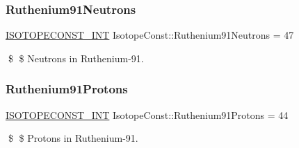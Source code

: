 \subsubsection{\texorpdfstring{Ruthenium91\+Neutrons}{Ruthenium91Neutrons}}
{\footnotesize\ttfamily \mbox{\hyperlink{group___isotope_const-_macros_ga5f18360b3e99483a35c32d789e62621c}{I\+S\+O\+T\+O\+P\+E\+C\+O\+N\+S\+T\+\_\+\+I\+NT}} Isotope\+Const\+::\+Ruthenium91\+Neutrons = 47}

\$ \$ Neutrons in Ruthenium-\/91. \mbox{\label{group___isotope_const-_ruthenium-_ru91_ga5cf4b83c3088cc2e5157c1dda2fd23fe}} 
\subsubsection{\texorpdfstring{Ruthenium91\+Protons}{Ruthenium91Protons}}
{\footnotesize\ttfamily \mbox{\hyperlink{group___isotope_const-_macros_ga5f18360b3e99483a35c32d789e62621c}{I\+S\+O\+T\+O\+P\+E\+C\+O\+N\+S\+T\+\_\+\+I\+NT}} Isotope\+Const\+::\+Ruthenium91\+Protons = 44}

\$ \$ Protons in Ruthenium-\/91. 